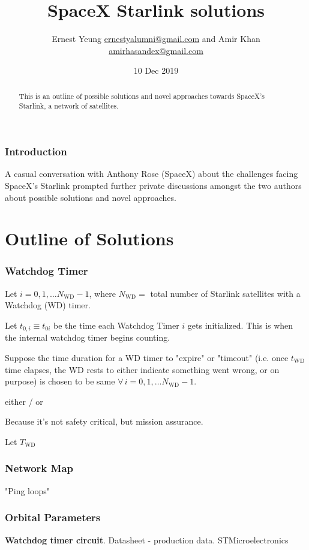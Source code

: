 \documentclass[10pt]{amsart}
\title[SpaceX Starlink solutions]{SpaceX Starlink solutions}
\author{Ernest Yeung \href{mailto:ernestyalumni@gmail.com}{ernestyalumni@gmail.com} and Amir Khan \href{mailto:amirhasandex@gmail.com}{amirhasandex@gmail.com}}
\date{10 Dec 2019}
\begin{document}

\maketitle

\tableofcontents

\begin{abstract}
This is an outline of possible solutions and novel approaches towards SpaceX's Starlink, a network of satellites.
\end{abstract}

\section{Introduction}

A casual conversation with Anthony Rose (SpaceX) about the challenges facing SpaceX's Starlink prompted further private discussions amongst the two authors about possible solutions and novel approaches.

\part{Outline of Solutions}

\section{Watchdog Timer} 

Let $i = 0 , 1, \dots N_{\text{WD}} - 1$, where $N_{\text{WD}} = $ total number of Starlink satellites with a Watchdog (WD) timer.

Let $t_{0,i} \equiv t_{0i}$ be the time each Watchdog Timer $i$ gets initialized. This is when the internal watchdog timer begins counting.

Suppose the time duration for a WD timer to "expire" or "timeout" (i.e. once $t_{\text{WD}}$ time elapses, the WD rests to either indicate something went wrong, or on purpose) is chosen to be same $\forall \, i = 0 ,1, \dots N_{\text{WD}} -1$.

either / or 

Because it's not safety critical, but mission assurance.

Let $T_{\text{WD}}$

\section{Network Map}

"Ping loops"

\section{Orbital Parameters}




\begin{thebibliography}{9}

\textbf{Watchdog timer circuit}. Datasheet - production data. STMicroelectronics



\end{thebibliography}
\end{document}
